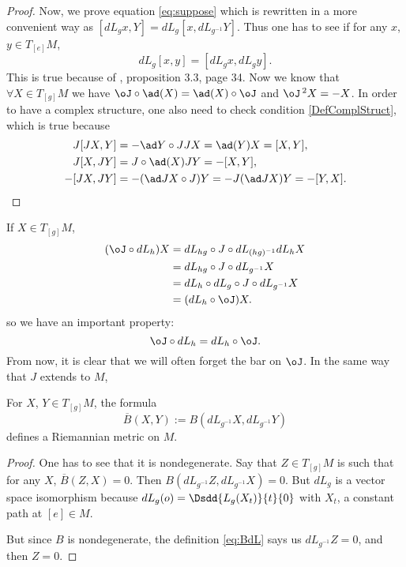 \begin{proof}
Now, we prove equation \eqref{eq:suppose} which is rewritten in a more convenient way as $[dL_g x,Y]=dL_g[x,dL_{g^{-1}}Y]$. Thus one has to see if for any $x$, $y\in T_{[e]}M$, 
\[
   dL_g[x,y]=[dL_g x,dL_g y].
\]
This is true because of \cite{Helgason}, proposition 3.3, page 34.  Now we know that $\forall X\in T_{[g]}M$ we have $\oJ\circ\ad(X)=\ad(X)\circ\oJ$ and ${\oJ}\,^2X=-X$.  In order to have a complex structure, one also need to check condition \eqref{DefComplStruct}, which is true because
\begin{equation}
\begin{split}
J[JX,Y]&=-\ad Y\circ JJX=\ad(Y)X=[X,Y],\\
J[X,JY]&=J\circ\ad(X)JY=-[X,Y],\\
-[JX,JY]&=-(\ad JX\circ J)Y
        =-J(\ad JX)Y
	=-[Y,X].
\end{split}
\end{equation}

\end{proof}

\noindent If $X\in T_{[g]}M$,
\begin{equation}\nonumber
\begin{split}
  (\oJ\circ dL_h)X&=dL_{hg}\circ J\circ dL_{(hg)^{-1}}dL_h X\\
           &=dL_{hg}\circ J\circ dL_{g^{-1}} X\\
	   &=dL_h\circ dL_g\circ J\circ dL_{g^{-1}} X\\
	   &=(dL_h\circ \oJ)X.
\end{split}
\end{equation}
so we have an important property:
\begin{equation}\label{eq:J_dL}
   \oJ\circ dL_h=dL_h\circ\oJ.
\end{equation}
From now, it is clear that we will often forget the bar on $\oJ$.  In the same way that $J$ extends to $M$, 

\begin{proposition}
For $X$, $Y\in T_{[g]}M$, the formula
\begin{equation}\label{eq:BdL}
  \overline{ B }(X,Y):=B(dL_{g^{-1}}X,dL_{g^{-1}}Y)
\end{equation}
defines a Riemannian metric on $M$.
\end{proposition}

\begin{proof}
One has to see that it is nondegenerate. Say that $Z\in T_{[g]}M$ is such that for any $X$, 
$\overline{ B }(Z,X)=0$. Then $B(dL_{g^{-1}}Z,dL_{g^{-1}}X)=0$. But $dL_g$ is a vector space isomorphism because 
$dL_g(o)=\Dsdd{L_g(X_t)}{t}{0}$ with $X_t$, a constant path at $[e]\in M$.
       
But since $B$ is nondegenerate, the definition \eqref{eq:BdL} says us $dL_{g^{-1}}Z=0$, and then $Z=0$.
\end{proof}


